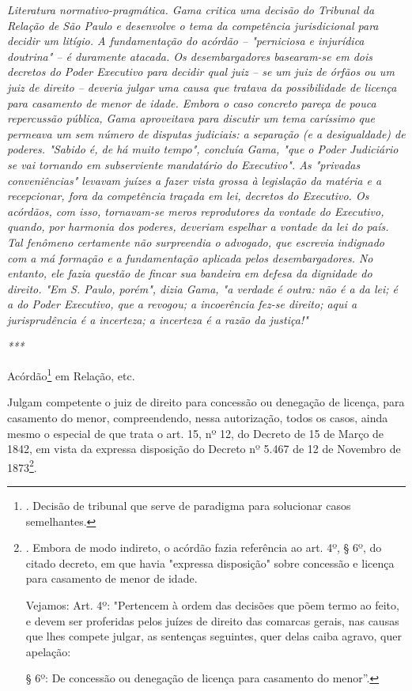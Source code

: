 \emph{Literatura normativo-pragmática. Gama critica uma decisão do
Tribunal da Relação de São Paulo e desenvolve o tema da competência
jurisdicional para decidir um litígio. A fundamentação do acórdão --
"perniciosa e injurídica doutrina" -- é duramente atacada. Os
desembargadores basearam-se em dois decretos do Poder Executivo para
decidir qual juiz -- se um juiz de órfãos ou um juiz de direito --
deveria julgar uma causa que tratava da possibilidade de licença para
casamento de menor de idade. Embora o caso concreto pareça de pouca
repercussão pública, Gama aproveitava para discutir um tema caríssimo
que permeava um sem número de disputas judiciais: a separação (e a
desigualdade) de poderes. "Sabido é, de há muito tempo", concluía Gama,
"que o Poder Judiciário se vai tornando em subserviente mandatário do
Executivo". As "privadas conveniências" levavam juízes a fazer vista
grossa à legislação da matéria e a recepcionar, fora da competência
traçada em lei, decretos do Executivo. Os acórdãos, com isso,
tornavam-se meros reprodutores da vontade do Executivo, quando, por
harmonia dos poderes, deveriam espelhar a vontade da lei do país. Tal
fenômeno certamente não surpreendia o advogado, que escrevia indignado
com a má formação e a fundamentação aplicada pelos desembargadores. No
entanto, ele fazia questão de fincar sua bandeira em defesa da dignidade
do direito. "Em S. Paulo, porém", dizia Gama, "a verdade é outra: não é
a da lei; é a do Poder Executivo, que a revogou; a incoerência fez-se
direito; aqui a jurisprudência é a incerteza; a incerteza é a razão da
justiça!"}

\emph{***}

Acórdão\footnote{. Decisão de tribunal que serve de paradigma para
  solucionar casos semelhantes.} em Relação, etc.

Julgam competente o juiz de direito para concessão ou denegação de
licença, para casamento do menor, compreendendo, nessa autorização,
todos os casos, ainda mesmo o especial de que trata o art. 15, nº 12, do
Decreto de 15 de Março de 1842, em vista da expressa disposição do
Decreto nº 5.467 de 12 de Novembro de 1873\footnote{. Embora de modo
  indireto, o acórdão fazia referência ao art. 4º, § 6º, do citado
  decreto, em que havia "expressa disposição" sobre concessão e licença
  para casamento de menor de idade.

  Vejamos: Art. 4º: "Pertencem à ordem das decisões que põem termo ao
  feito, e devem ser proferidas pelos juízes de direito das comarcas
  gerais, nas causas que lhes compete julgar, as sentenças seguintes,
  quer delas caiba agravo, quer apelação:

  § 6º: De concessão ou denegação de licença para casamento do menor''.}.

